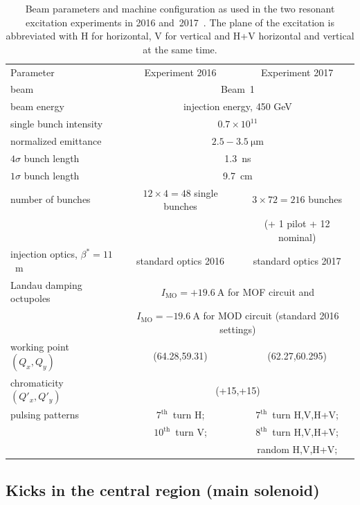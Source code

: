 \documentclass[%
 reprint,
 amsmath,amssymb,
 aps,
prstab,
]{revtex4-1}
\begin{document}
\begin{table}
	\caption{\label{tab:md_param}%
		Beam parameters and machine configuration as used in the two resonant excitation experiments in 2016 and~2017~\cite{resexmd2016,resexmd2017}. The plane of the excitation is abbreviated with H for horizontal, V for vertical and H+V horizontal and vertical at the same time.
	}
	\begin{ruledtabular}
		\begin{tabular}{lcc}
			Parameter & Experiment 2016 & Experiment 2017  \\
			\colrule
			beam &\multicolumn{2}{c}{Beam~1} \\
			beam energy &\multicolumn{2}{c}{injection energy, 450 GeV} \\\hline
			single bunch intensity &\multicolumn{2}{c}{$0.7\times10^{11}$} \\
			normalized emittance &\multicolumn{2}{c}{$2.5-3.5~\mathrm{\mu m}$} \\
			$4\sigma$ bunch length & \multicolumn{2}{c}{1.3~ns}\\
			$1\sigma$ bunch length & \multicolumn{2}{c}{9.7~cm}\\
			number of bunches & $12\times4=48$ single bunches & $3\times72=216$ bunches\\
			&  & (+ 1 pilot + 12 nominal) \\\hline
			injection optics, $\beta^*=11$~m & standard optics 2016 & standard optics 2017\\
			Landau damping octupoles  & \multicolumn{2}{c}{$I_{\mathrm{MO}}=+19.6~\mathrm{A}$ for MOF circuit and}\\
			& \multicolumn{2}{c}{$I_{\mathrm{MO}}=-19.6~\mathrm{A}$ for MOD circuit (standard 2016 settings)}\\\hline
			working point $(Q_x,Q_y)$ & (64.28,59.31) & (62.27,60.295) \\
			chromaticity $(Q'_x,Q'_y)$ & \multicolumn{2}{c}{(+15,+15)}\\\hline
			pulsing patterns  &$7^{\mathrm{th}}$~turn H; &$7^{\mathrm{th}}$~turn H,V,H+V; \\
			& $10^{\mathrm{th}}$~turn V; & $8^{\mathrm{th}}$~turn H,V,H+V; \\
			& &  random  H,V,H+V;\\
		\end{tabular}
	\end{ruledtabular}
\end{table}

\subsection{Kicks in the central region (main solenoid)}
\label{core:sec:2}
\end{document}

